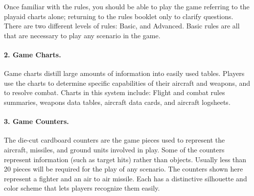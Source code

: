 Once familiar with the rules, you should be able to play the game referring to the play{\xhyphen}aid charts alone; returning to the rules booklet only to clarify questions. There are two different levels of rules: Basic, and Advanced. Basic rules are all that are necessary to play any scenario in the game.

\paragraph{2. Game Charts.} Game charts distill large amounts of information into easily used tables. Players use the charts to determine specific capabilities of their aircraft and weapons, and to resolve combat. Charts in this system include: Flight and combat rules summaries, weapons data tables, aircraft data cards, and aircraft logsheets.

\paragraph{3. Game Counters.} The die-cut cardboard counters are the game pieces used to represent the aircraft, missiles, and ground units involved in play. Some of the counters represent information (such as target hits) rather than objects. Usually less than 20 pieces will be required for the play of any scenario. The counters shown here represent a fighter and an air to air missile. Each has a distinctive silhouette and color scheme that lets players recognize them easily.

